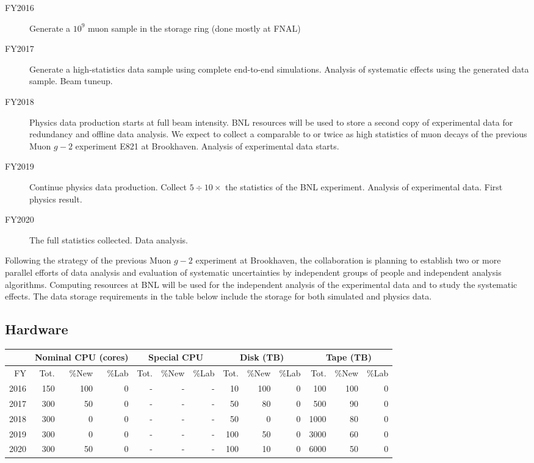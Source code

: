 \documentclass[pdftex,12pt,letter]{article}
\begin{document}
\begin{description}
\item[FY2016] 
Generate a $10^9$ muon sample in the storage ring (done mostly at FNAL)
\item[FY2017] 
  Generate a high-statistics data sample using complete end-to-end simulations. 
  Analysis of systematic effects using the generated data sample. 
  Beam tuneup. 
\item[FY2018] 
  Physics data production starts at full beam intensity. 
  BNL resources will be used to store a second copy of experimental data for redundancy and offline data analysis. 
  We expect to collect a comparable to or twice as high statistics of muon decays of the previous Muon $g-2$ experiment E821 at Brookhaven. 
  Analysis of experimental data starts. 
\item[FY2019] 
  Continue physics data production. 
  Collect $5\div 10\times$ the statistics of the BNL experiment. 
  Analysis of experimental data.  
  First physics result. 
\item[FY2020]
  The full statistics collected. Data analysis.  
\end{description}

\noindent Following the strategy of the previous Muon $g-2$ experiment at Brookhaven, the collaboration is
planning to establish two or more parallel efforts of data analysis and evaluation of systematic uncertainties by
independent groups of people and independent analysis algorithms.  Computing resources at BNL will be used for
the independent analysis of the experimental data and to study the systematic effects. 
The data storage requirements in the table below include the storage for both simulated and physics data. 

\subsection{Hardware}

\begin{tabular}[h]{|r || r|r|r || r|r|r || r|r|r || r|r|r ||}
  \hline
   & \multicolumn{3}{c||}{Nominal CPU (cores)} & \multicolumn{3}{c||}{Special CPU} & \multicolumn{3}{c||}{Disk (TB)} & \multicolumn{3}{c||}{Tape (TB)} \\
   \hline
  FY & Tot. & \%New & \%Lab & Tot. & \%New & \%Lab & Tot. & \%New & \%Lab & Tot. & \%New & \%Lab \\
  \hline
  2016 & 150 & 100 &  0& - &- &- & 10 & 100 & 0& 100 &  100 & 0\\
  \hline
  2017 & 300 &  50  & 0& - &- &- &  50 &  80    &0 & 500 &   90 & 0\\
  \hline
  2018 & 300 &   0   & 0& - &- &- &  50 & 0      &0 & 1000 &   80 & 0\\
  \hline
  2019 & 300 &   0   & 0& - &- &- & 100 & 50     &0 & 3000 &   60 & 0\\
  \hline
  2020 & 300 &  50  &  0&-  &- &- & 100 &  10    &0 & 6000 &   50 & 0\\
  \hline
\end{tabular}
\end{document}
